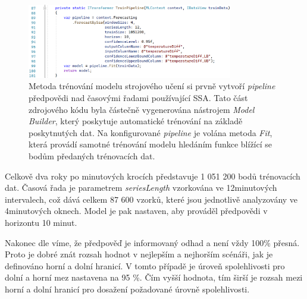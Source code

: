 \begin{figure}[hbt]
\includegraphics[width=0.8\textwidth]{obrazky-figures/ml-pipeline.png}
\caption{Metoda trénování modelu strojového učení si prvně vytvoří {\it pipeline} předpovědi nad časovými řadami používající SSA. Tato část zdrojového kódu byla částečně vygenerována nástrojem {\it Model Builder}, který poskytuje automatické trénování na základě poskytnutých dat. Na konfigurované {\it pipeline} je volána metoda {\it Fit}, která provádí samotné trénování modelu hledáním funkce blížící se bodům předaných trénovacích dat.}
\end{figure}

Celkově dva roky po minutových krocích představuje 1 051 200 bodů trénovacích dat. Časová řada je parametrem {\it seriesLength} vzorkována ve 12minutových intervalech, což dává celkem 87 600 vzorků, které jsou jednotlivě analyzovány ve 4minutových oknech. Model je pak nastaven, aby prováděl předpovědi v horizontu 10 minut. 

Nakonec dle \cite{mlnet_tutorial} víme, že předpověď je informovaný odhad a není vždy 100\% přesná. Proto je dobré znát rozsah hodnot v nejlepším a nejhorším scénáři, jak je definováno horní a dolní hranicí. V tomto případě je úroveň spolehlivosti pro dolní a horní mez nastavena na 95 \%. Čím vyšší hodnota, tím širší je rozsah mezi horní a dolní hranicí pro dosažení požadované úrovně spolehlivosti.

